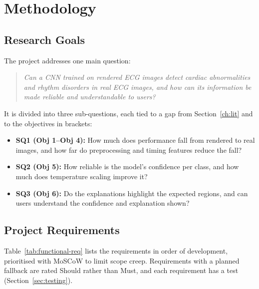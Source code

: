 \documentclass[12pt,nonacm,acmlarge,titlepage,screen]{acmart}
\begin{document}
\section{Methodology}
\label{ch:method}

\subsection{Research Goals}
\label{sec:goals}
The project addresses one main question:
\begin{quote}
\emph{Can a CNN trained on rendered ECG images detect cardiac abnormalities and rhythm disorders in real ECG images, and how can its information be made reliable and understandable to users?}
\end{quote}
It is divided into three sub-questions, each tied to a gap from Section~\ref{ch:lit} and to the objectives in brackets:
\begin{itemize}
  \item \textbf{SQ1 (Obj 1--Obj 4):} How much does performance fall from rendered to real images, and how far do preprocessing and timing features reduce the fall?
  \item \textbf{SQ2 (Obj 5):} How reliable is the model's confidence per class, and how much does temperature scaling improve it?
  \item \textbf{SQ3 (Obj 6):} Do the explanations highlight the expected regions, and can users understand the confidence and explanation shown?
\end{itemize}

\subsection{Project Requirements}
\label{sec:requirements}
Table~\ref{tab:functional-req} lists the requirements in order of development, prioritised with MoSCoW to limit scope creep. Requirements with a planned fallback are rated Should rather than Must, and each requirement has a test (Section~\ref{sec:testing}).
\end{document}
